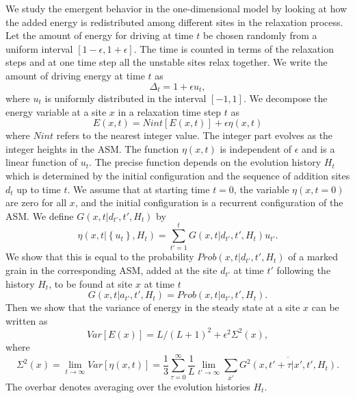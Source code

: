 \documentclass[11pt,a4paper]{book}
\begin{document}
We study the emergent behavior in the one-dimensional
model by looking at how the added energy is redistributed among
different sites in the relaxation process. Let the amount of energy
for driving at time $t$ be chosen randomly from a uniform interval $\left
[1-\epsilon, 1+\epsilon \right ]$. The time is counted in terms of
the relaxation steps and at one time step all the unstable sites relax
together. We write the amount of driving energy at time $t$ as
\begin{equation}
\Delta_{t}=1+\epsilon u_{t},
\end{equation}
where $u_{t}$ is uniformly distributed in the interval $\left[ -1,1
\right]$. We decompose the energy variable at a site $x$ in a
relaxation time step $t$ as
\begin{equation}
E\left( x,t \right)=Nint[E\left( x,t \right)]+\epsilon \eta\left( x,t
\right)
\end{equation}
where $Nint$ refers to the nearest integer value. The integer part
evolves as the integer heights in the ASM. The function $\eta\left(
x,t \right)$ is independent of $\epsilon$ and is a linear function of
$u_{t}$. The precise function depends on the evolution history
$H_{t}$ which
is determined by the initial configuration and the sequence of
addition sites $d_{t}$ up to time $t$. We assume that at starting time
$t=0$, the variable $\eta\left( x,t=0 \right)$ are zero for all
$x$, and the initial configuration is a recurrent configuration of the
ASM. We define $G\left( x, t|d_{t'},t',H_{t} \right)$ by
\begin{equation}
\eta\left( x,t| \left\{ u_{t} \right\},H_{t}
\right)=\sum_{t'=1}^{t}G\left( x,t|d_{t'},t',H_{t} \right)u_{t'}.
\end{equation}
We show that this is equal to the probability $Prob\left( x, t
|d_{t'},t',H_{t}
\right)$ of a marked grain in
the corresponding ASM, added at the site $d_{t'}$ at time $t'$ following
the history $H_{t}$, to be found at site $x$ at time $t$
\begin{equation}
G\left( x, t|a_{t'},t',H_{t} \right)=Prob\left( x, t|a_{t'},t',
H_{t} \right).
\end{equation}
Then we show that the variance of energy in the steady state at a site $x$
can be written as
\begin{equation}
Var\left[ E\left( x \right)
\right]=L/(L+1)^{2}+\epsilon^{2}\Sigma^{2}\left( x \right),
\end{equation}
where
\begin{equation}
\Sigma^{2}\left( x \right)=\lim_{t\rightarrow \infty}Var\left[
\eta\left( x,t \right)
\right]=\frac{1}{3}\sum_{\tau=0}^{\infty}\frac{1}{L}\lim_{t'\rightarrow\infty}\sum_{x'}\overline{G^{2}
(x,t'+\tau|x',t',H_{t} )}.
\end{equation}
The overbar denotes averaging over the evolution histories $H_{t}$.
\end{document}
